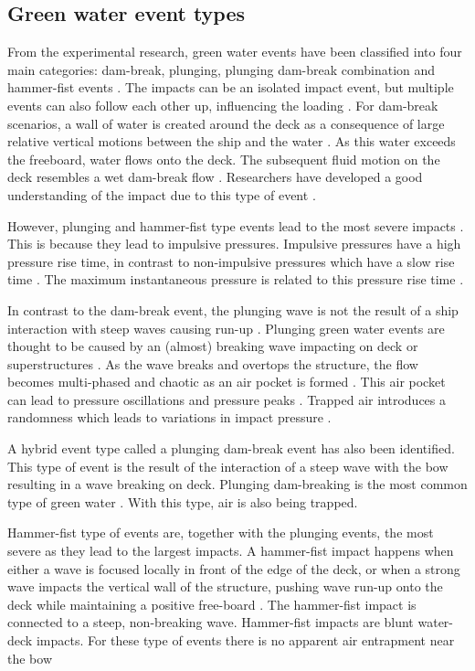 \subsection{Green water event types}
\label{sec:lit_event_types}
From the experimental research, green water events have been classified into four main categories: dam-break, plunging, plunging dam-break combination and hammer-fist events \cite{Greco2007,Chuang2019,Zhang2019}. The impacts can be an isolated impact event, but multiple events can also follow each other up, influencing the loading \cite{Kendon2010}.  For dam-break scenarios, a wall of water is created around the deck as a consequence of large relative vertical motions between the ship and the water \cite{Buchner2002}. As this water exceeds the freeboard, water flows onto the deck. The subsequent fluid motion on the deck resembles a wet dam-break flow \cite{Faltinsen2002}.  Researchers have developed a good understanding of the impact due to this type of event \cite{Ariyarathne2012}. 
\par 
However, plunging and hammer-fist type events lead to the most severe impacts \cite{Greco2007}. This is because they lead to impulsive pressures. Impulsive pressures have a high pressure rise time, in contrast to non-impulsive pressures which have a slow rise time \cite{Chuang2019}. The maximum instantaneous pressure is related to this pressure rise time \cite{Song2015}. 
\par 
In contrast to the dam-break event, the plunging wave is not the result of a ship interaction with steep waves causing run-up \cite{Chuang2019,Faltinsen2002}. Plunging green water events are thought to be caused by an (almost) breaking wave impacting on deck or superstructures \cite{Faltinsen2002}. As the wave breaks and overtops the structure, the flow becomes multi-phased and chaotic as an air pocket is formed \cite{Temarel2016}. This air pocket can lead to pressure oscillations and pressure peaks \cite{Lee2020}. Trapped air introduces a randomness which leads to variations in impact pressure \cite{Ariyarathne2012}. 
\par
A hybrid event type called a plunging dam-break event has also been identified. This type of event is the result of the interaction of a steep wave with the bow resulting in a wave breaking on deck. 
Plunging dam-breaking is the most common type of green water \cite{Greco2007, Greco2012}. With this type, air is also being trapped.  \par 
Hammer-fist type of events are, together with the plunging events, the most severe as they lead to the largest impacts. A hammer-fist impact happens when either a wave is focused locally in front of the edge of the deck, or when a strong wave impacts the vertical wall of the structure, pushing wave run-up onto the deck while maintaining a positive free-board \cite{Chuang2019}. The hammer-fist impact is connected to a steep, non-breaking wave. Hammer-fist impacts are blunt water-deck impacts. For these type of events there is no apparent air entrapment near the bow \cite{Greco2007} 
